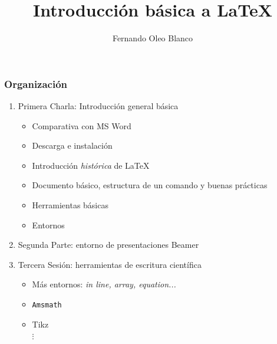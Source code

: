\documentclass{beamer}
\title[\LaTeXe]{Introducción básica a \LaTeX} %
\author{Fernando Oleo Blanco} %
\institute[ICAI] %
{
Universidad ICAI Comillas \\ %
Asociación de LinuxEC \\
\medskip
\textit{201507027@alu.comillas.edu} %
}
\date %
\begin{document}
\begin{frame}
\titlepage %
\end{frame}

\begin{frame}
\frametitle{Organización} %

\begin{enumerate}
	\item Primera Charla: Introducción general básica
	\begin{itemize}
		\item Comparativa con MS Word
		\item Descarga e instalación
		\item Introducción \textit{histórica} de \LaTeX
		\item Documento básico, estructura de un comando y buenas prácticas
		\item Herramientas básicas
		\item Entornos
	\end{itemize}
	\item Segunda Parte: entorno de presentaciones Beamer
	\item Tercera Sesión: herramientas de escritura científica
	\begin{itemize}
		\item Más entornos: \textit{in line, array, equation...}
		\item \texttt{Amsmath}
		\item Tikz \\
		$\vdots$
	\end{itemize}
\end{enumerate}

\end{frame}
\end{document}
